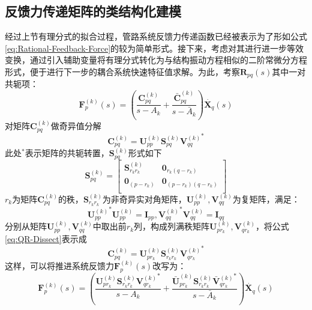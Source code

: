 \subsection{反馈力传递矩阵的类结构化建模}
经过上节有理分式的拟合过程，管路系统反馈力传递函数已经被表示为了形如公式\eqref{eq:Rational-Feedback-Force}的较为简单形式。接下来，考虑对其进行进一步等效变换，通过引入辅助变量将有理分式转化为与结构振动方程相似的二阶常微分方程形式，便于进行下一步的耦合系统快速特征值求解。为此，考察$\boldsymbol{R}_{pq}(s)$其中一对共轭项：
\begin{equation}
  \label{eq:Feedback-Force-Original}
  \boldsymbol{F}_p^{(k)}(s)=\left( \frac{\boldsymbol{C}_{pq}^{(k)}}{s-A_k}+ \frac{\bar{\boldsymbol{C}}_{pq}^{(k)}}{s-\bar{A}_k} \right) \dot{\boldsymbol{X}_q}(s)
\end{equation}
对矩阵$\boldsymbol{C}_{pq}^{(k)}$做奇异值分解\cite{Golub:1996}
\begin{equation}
  \label{eq:QR-Dissect}
  \boldsymbol{C}_{pq}^{(k)}=\boldsymbol{U}_{pp}^{(k)}\boldsymbol{S}_{pq}^{(k)}{\boldsymbol{V}_{qq}^{(k)}}^{*}
\end{equation}
此处${}^*$表示矩阵的共轭转置，$\boldsymbol{S}_{pq}^{(k)}$形式如下
\begin{equation}
  \label{eq:SVD-Rank-Analysis}
  \boldsymbol{S}_{pq}^{(k)}=\left[ \begin{matrix}
      \boldsymbol{S}_{r_kr_k}^{(k)} & \boldsymbol{0}_{r_k(q-r_k)}     \\
      \boldsymbol{0}_{(p-r_k)}      & \boldsymbol{0}_{(p-r_k)(q-r_k)} \\
    \end{matrix} \right]
\end{equation}
$r_k$为矩阵$\boldsymbol{C}_{pq}^{(k)}$的秩，$\boldsymbol{S}_{r_kr_k}^{(k)}$为非奇异实对角矩阵，$\boldsymbol{U}_{pp}^{(k)}, \boldsymbol{V}_{qq}^{(k)}$为复矩阵，满足：
\begin{equation}
  {\boldsymbol{U}_{pp}^{(k)}}^*\boldsymbol{U}_{pp}^{(k)}=\boldsymbol{I}_{pp},
  {\boldsymbol{V}_{qq}^{(k)}}^*\boldsymbol{V}_{qq}^{(k)}=\boldsymbol{I}_{qq}
\end{equation}
分别从矩阵$\boldsymbol{U}_{pp}^{(k)}, \boldsymbol{V}_{qq}^{(k)}$中取出前$r_k$列，构成列满秩矩阵$\boldsymbol{U}_{pr_k}^{(k)}, \boldsymbol{V}_{qr_k}^{(k)}$，将公式\eqref{eq:QR-Dissect}表示成
\begin{equation}
  \boldsymbol{C}_{pq}^{(k)}=\boldsymbol{U}_{pr_k}^{(k)}\boldsymbol{S}_{r_kr_k}^{(k)}{\boldsymbol{V}_{qr_k}^{(k)}}^{*}
\end{equation}
这样，可以将推进系统反馈力$\boldsymbol{F}_p^{(k)}(s)$改写为：
\begin{equation}
  \label{eq:Single-SVD-Feedback-Force}
  \boldsymbol{F}_p^{(k)}(s)=\left( \frac{
  \boldsymbol{U}_{pr_k}^{(k)}\boldsymbol{S}_{r_kr_k}^{(k)}{\boldsymbol{V}_{qr_k}^{(k)}}^{*}
  }{s-A_k}+ \frac{
  \boldsymbol{\bar{U}}_{pr_k}^{(k)}\boldsymbol{S}_{r_kr_k}^{(k)}{\boldsymbol{\bar{V}}}{{}_{qr_k}^{(k)}}^{*}
  }{s-\bar{A}_k} \right) \dot{\boldsymbol{X}_q}(s)
\end{equation}

